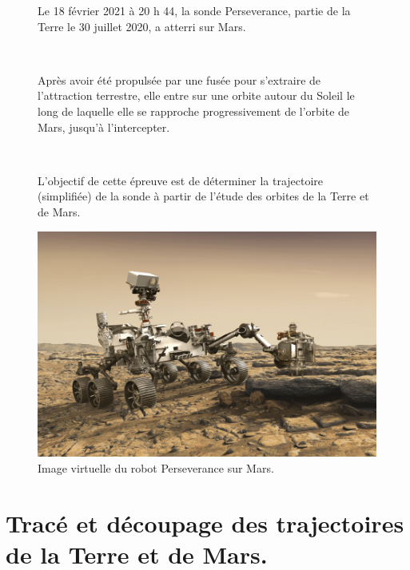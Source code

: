 \begin{figure}[ht!]
\begin{minipage}{0.48\linewidth}
Le 18 février 2021 à 20 h 44, la sonde Perseverance, partie de la Terre le 30 juillet 2020, a atterri sur Mars.

~\

Après avoir été propulsée par une fusée pour s'extraire de l'attraction terrestre, elle entre sur une orbite autour du Soleil le long de laquelle elle se rapproche progressivement de  l'orbite de Mars, jusqu'à l'intercepter.

~\

L'objectif de cette épreuve est de déterminer la trajectoire (simplifiée) de la sonde à partir de l'étude des orbites de la Terre et de Mars.
\end{minipage}\hfill
\begin{minipage}{0.47\linewidth}
  \begin{center}
  \includegraphics[width=0.9\linewidth]{img/perseverance}
  \caption{Image virtuelle du robot Perseverance sur Mars.}
  \label{perseverance}  \end{center}
 
\end{minipage}
\end{figure}

\section*{Tracé et découpage des trajectoires de la Terre et de Mars.}

